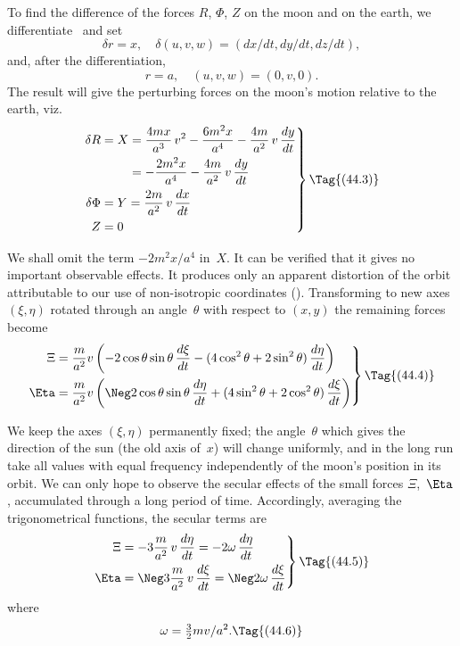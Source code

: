 \documentclass[12pt]{book}
\begin{document}
To find the difference of the forces $R$, $\Phi$, $Z$ on the moon and on the earth,
we differentiate~ and set
\[
\delta r = x,\quad
\delta(u, v, w) = (dx/dt, dy/dt, dz/dt),
\]
and, after the differentiation,
\[
r = a,\quad
(u, v, w) = (0, v, 0).
\]
The result will give the perturbing forces on the moon's motion relative to
the earth, viz.\
\[
\left.
\begin{aligned}
  \delta R
  &= \begin{aligned}[t]
    X &= \frac{4mx}{a^{3}}\, v^{2} - \frac{6m^{2}x}{a^{4}} - \frac{4m}{a^{2}}\, v\, \frac{dy}{dt} \\
    &= -\frac{2m^{2}x}{a^{4}} - \frac{4m}{a^{2}}\, v\, \frac{dy}{dt}
  \end{aligned} \\
  \delta\Phi &= Y = \frac{2m}{a^{2}}\, v\, \frac{dx}{dt}\\
  Z &= 0
\end{aligned}
\right\}
\Tag{(44.3)}
\]

We shall omit the term $-2m^{2}x/a^{4}$ in~$X$. It can be verified that it gives
no important observable effects. It produces only an apparent distortion of
the orbit attributable to our use of non-isotropic coordinates (\SecRef{43}). Transforming
to new axes $(\xi, \eta)$ rotated through an angle~$\theta$ with respect to $(x, y)$
the remaining forces become
\[
\left.
\begin{aligned}
  \Xi &= \frac{m}{a^{2}} v \left(-2\cos\theta \sin\theta\, \frac{d\xi}{dt} - (4\cos^{2}\theta + 2\sin^{2}\theta)\, \frac{d\eta}{dt}\right)\\
  \Eta &= \frac{m}{a^{2}} v \left(\Neg2\cos\theta \sin\theta\, \frac{d\eta}{dt} + (4\sin^{2}\theta + 2\cos^{2}\theta)\, \frac{d\xi}{dt}\right)
\end{aligned}
\right\}
\Tag{(44.4)}
\]

We keep the axes $(\xi, \eta)$ permanently fixed; the angle~$\theta$ which gives the
direction of the sun (the old axis of~$x$) will change uniformly, and in the long
run take all values with equal frequency independently of the moon's position
in its orbit. We can only hope to observe the secular effects of the small forces
$\Xi$,~$\Eta$, accumulated through a long period of time. Accordingly, averaging the
trigonometrical functions, the secular terms are
\[
\left.
\begin{aligned}
  \Xi &= -3\frac{m}{a^{2}}\, v\, \frac{d\eta}{dt}
  = -2\omega\, \frac{d\eta}{dt}\\
  \Eta &= \Neg 3\frac{m}{a^{2}}\, v\, \frac{d\xi}{dt}
  = \Neg2\omega\, \frac{d\xi}{dt}
\end{aligned}
\right\}
\Tag{(44.5)}
\]
where
\[
\omega = \tfrac{3}{2}mv/a^{2}.
\Tag{(44.6)}
\]
\end{document}
